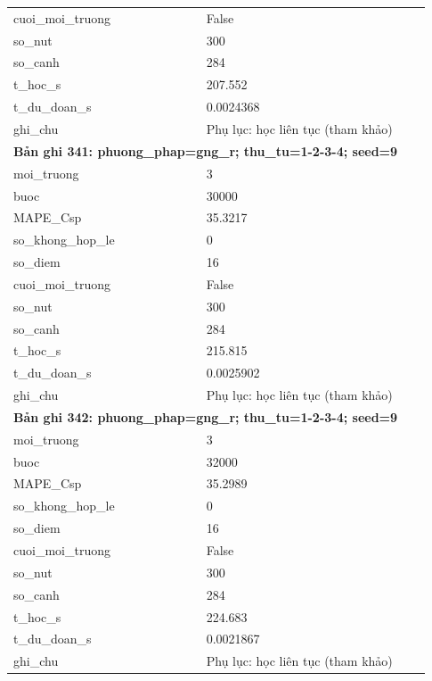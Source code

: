 \begin{longtable}{p{0.43\linewidth}p{0.50\linewidth}}
cuoi\_\allowbreak moi\_\allowbreak truong & False \\
so\_\allowbreak nut & 300 \\
so\_\allowbreak canh & 284 \\
t\_\allowbreak hoc\_\allowbreak s & 207.552 \\
t\_\allowbreak du\_\allowbreak doan\_\allowbreak s & 0.0024368 \\
ghi\_\allowbreak chu & Phụ lục: học liên tục (tham khảo) \\
\midrule
\multicolumn{2}{p{0.95\linewidth}}{\textbf{Bản ghi 341: phuong\_phap=gng\_r; thu\_tu=1-2-3-4; seed=9}} \\
moi\_\allowbreak truong & 3 \\
buoc & 30000 \\
MAPE\_\allowbreak Csp & 35.3217 \\
so\_\allowbreak khong\_\allowbreak hop\_\allowbreak le & 0 \\
so\_\allowbreak diem & 16 \\
cuoi\_\allowbreak moi\_\allowbreak truong & False \\
so\_\allowbreak nut & 300 \\
so\_\allowbreak canh & 284 \\
t\_\allowbreak hoc\_\allowbreak s & 215.815 \\
t\_\allowbreak du\_\allowbreak doan\_\allowbreak s & 0.0025902 \\
ghi\_\allowbreak chu & Phụ lục: học liên tục (tham khảo) \\
\midrule
\multicolumn{2}{p{0.95\linewidth}}{\textbf{Bản ghi 342: phuong\_phap=gng\_r; thu\_tu=1-2-3-4; seed=9}} \\
moi\_\allowbreak truong & 3 \\
buoc & 32000 \\
MAPE\_\allowbreak Csp & 35.2989 \\
so\_\allowbreak khong\_\allowbreak hop\_\allowbreak le & 0 \\
so\_\allowbreak diem & 16 \\
cuoi\_\allowbreak moi\_\allowbreak truong & False \\
so\_\allowbreak nut & 300 \\
so\_\allowbreak canh & 284 \\
t\_\allowbreak hoc\_\allowbreak s & 224.683 \\
t\_\allowbreak du\_\allowbreak doan\_\allowbreak s & 0.0021867 \\
ghi\_\allowbreak chu & Phụ lục: học liên tục (tham khảo) \\

\end{longtable}
